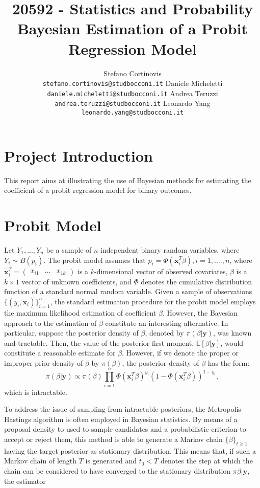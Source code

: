 \documentclass{article}
\title{20592 - Statistics and Probability\\Bayesian Estimation of a Probit Regression Model}
\author{%
  Stefano Cortinovis \\
  \texttt{stefano.cortinovis@studbocconi.it}
  \And
  Daniele Micheletti\\
  \texttt{daniele.micheletti@studbocconi.it}
  \And
  Andrea Teruzzi\\
  \texttt{andrea.teruzzi@studbocconi.it}
  \And
  Leonardo Yang\\
  \texttt{leonardo.yang@studbocconi.it}
}
\newcommand{\EX}[0]{\mathbb{E}} %
\renewcommand{\vec}[1]{\mathbf{#1}}
\begin{document}
\maketitle

\section{Project Introduction}

This report aims at illustrating the use of Bayesian methods for estimating the coefficient of a probit regression model for binary outcomes. 

\section{Probit Model}
Let \(Y_1,...,Y_n\) be a sample of \(n\) independent binary random variables, where \(Y_i \sim B(p_i)\). The probit model assumes that \(p_i = \Phi(\vec{x}_i^T \beta), i = 1,....,n\), where \(\vec{x}_i^T = \begin{pmatrix} x_{i1} & \hdots & x_{1k} \end{pmatrix}\) is a \(k\)-dimensional vector of observed covariates, \(\beta\) is a \(k \times 1\) vector of unknown coefficients, and \(\Phi\) denotes the cumulative distribution function of a standard normal random variable. Given a sample of observations \(\{(y_i, \vec{x}_i)\}_{i=1}^n\), the standard estimation procedure for the probit model employs the maximum likelihood estimation of coefficient \(\beta\). However, the Bayesian approach to the estimation of \(\beta\) constitute an interesting alternative. In particular, suppose the posterior density of \(\beta\), denoted by \(\pi(\beta|\vec{y})\),  was known and tractable. Then, the value of the posterior first moment, \(\EX[\beta|\vec{y}]\), would constitute a reasonable estimate for \(\beta\). However, if we denote the proper or improper prior density of \(\beta\) by \(\pi(\beta)\), the posterior density of \(\beta\) has the form:
\begin{equation*}
    \pi(\beta|\vec{y}) \propto \pi(\beta) \prod_{i=1}^n \Phi(\vec{x}_i^T \beta)^{y_i} (1 - \Phi(\vec{x}_i^T \beta))^{1 - y_i},
\end{equation*}
which is intractable.
\par 
To address the issue of sampling from intractable posteriors, the Metropolis-Hastings algorithm is often employed in Bayesian statistics. By means of a proposal density to used to sample candidates and a probabilistic criterion to accept or reject them, this method is able to generate a Markov chain \(\{\beta\}_{t \geq 1}\) having the target posterior as stationary distribution. This means that, if such a Markov chain of length \(T\) is generated and \(t_0 < T\) denotes the step at which the chain can be considered to have converged to the stationary distribution \(\pi{\beta|\vec{y}}\), the estimator
\end{document}
